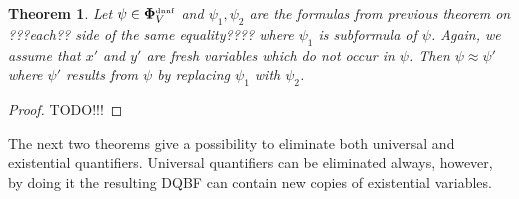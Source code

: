 \documentclass[
  digital, %
  twoside, %
  table,   %
  nolof,     %
  nolot,     %
]{fithesis3}
\newtheorem{theorem}{Theorem}[chapter] %
\theoremstyle{definition}
\theoremstyle{remark}
\newcommand{\DQBF}[1]{\mathbf{\Phi}_{#1}^{\text{\tiny dnnf}}}
\begin{document}
\begin{theorem}
  Let $\psi \in \DQBF{V}$ and $\psi_1, \psi_2$ are the formulas from previous theorem on ???each?? side of the same equality???? where $\psi_1$ is subformula of $\psi$. Again, we assume that $x'$ and $y'$ are fresh variables which do not occur in $\psi$. Then $\psi \approx \psi'$ where $\psi'$ results from $\psi$ by replacing $\psi_1$ with $\psi_2$.
\end{theorem}
\begin{proof}
  TODO!!!
\end{proof}


The next two theorems give a possibility to eliminate both universal and existential quantifiers. Universal quantifiers can be eliminated always, however, by doing it the resulting DQBF can contain new copies of existential variables.
\end{document}
